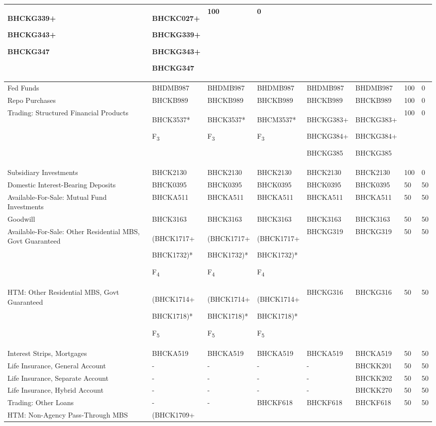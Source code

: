 \begin{landscape}
\begin{longtable}{|>{\raggedright}p{3cm}|>{\raggedright}p{2.2cm}|>{\raggedright}p{2.2cm}|>{\raggedright}p{2.2cm}|>{\raggedright}p{2.5cm}|>{\raggedright}p{2.5cm}|>{\raggedright}p{1cm}|>{\raggedright}p{1cm}|}
BHCKG339+

BHCKG343+

BHCKG347  & BHCKC027+

BHCKG339+

BHCKG343+

BHCKG347  & 100  & 0\tabularnewline
\hline 
Fed Funds  & BHDMB987  & BHDMB987  & BHDMB987  & BHDMB987  & BHDMB987  & 100  & 0\tabularnewline
\hline 
Repo Purchases  & BHCKB989  & BHCKB989  & BHCKB989  & BHCKB989  & BHCKB989  & 100  & 0\tabularnewline
\hline 
Trading: Structured Financial Products  & BHCK3537{*}

F\textsubscript{3}  & BHCK3537{*}

F\textsubscript{3}  & BHCM3537{*}

F\textsubscript{3}  & BHCKG383+

BHCKG384+

BHCKG385  & BHCKG383+

BHCKG384+

BHCKG385  & 100  & 0\tabularnewline
\hline 
Subsidiary Investments  & BHCK2130  & BHCK2130  & BHCK2130  & BHCK2130  & BHCK2130  & 100  & 0\tabularnewline
\hline 
Domestic Interest-Bearing Deposits  & BHCK0395  & BHCK0395  & BHCK0395  & BHCK0395  & BHCK0395  & 50  & 50\tabularnewline
\hline 
Available-For-Sale: Mutual Fund Investments  & BHCKA511  & BHCKA511  & BHCKA511  & BHCKA511  & BHCKA511  & 50  & 50\tabularnewline
\hline 
Goodwill  & BHCK3163  & BHCK3163  & BHCK3163  & BHCK3163  & BHCK3163  & 50  & 50\tabularnewline
\hline 
Available-For-Sale: Other Residential MBS, Govt Guaranteed  & (BHCK1717+

BHCK1732){*}

F\textsubscript{4}  & (BHCK1717+

BHCK1732){*}

F\textsubscript{4}  & (BHCK1717+

BHCK1732){*}

F\textsubscript{4}  & BHCKG319  & BHCKG319  & 50  & 50\tabularnewline
\hline 
HTM: Other Residential MBS, Govt Guaranteed  & (BHCK1714+

BHCK1718){*}

F\textsubscript{5}  & (BHCK1714+

BHCK1718){*}

F\textsubscript{5}  & (BHCK1714+

BHCK1718){*}

F\textsubscript{5}  & BHCKG316  & BHCKG316  & 50  & 50\tabularnewline
\hline 
Interest Strips, Mortgages  & BHCKA519  & BHCKA519  & BHCKA519  & BHCKA519  & BHCKA519  & 50  & 50\tabularnewline
\hline 
Life Insurance, General Account  & -  & -  & -  & -  & BHCKK201  & 50  & 50\tabularnewline
\hline 
Life Insurance, Separate Account  & -  & -  & -  & -  & BHCKK202  & 50  & 50\tabularnewline
\hline 
Life Insurance, Hybrid Account  & -  & -  & -  & -  & BHCKK270  & 50  & 50\tabularnewline
\hline 
Trading: Other Loans  & -  & -  & BHCKF618  & BHCKF618  & BHCKF618  & 50  & 50\tabularnewline
\hline 
HTM: Non-Agency Pass-Through MBS  & (BHCK1709+


\end{longtable}
\end{landscape}
